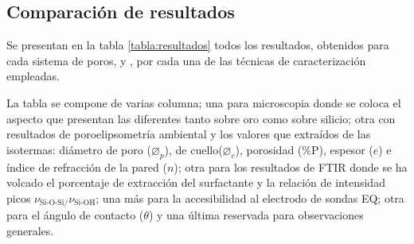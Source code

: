 	 \subsection{Comparación de resultados}
	 		
	 		Se presentan en la tabla \ref{tabla:resultados} todos los resultados, obtenidos para cada sistema de poros, \pdmF\space y \pdmC, por cada una de las técnicas de caracterización empleadas. 

	 		La tabla se compone de varias columna; una para microscopia donde se coloca el aspecto que presentan las diferentes \pdm\space tanto sobre oro como sobre silicio; otra con resultados de poroelipsometría ambiental y los valores que extraídos de las isotermas: diámetro de poro ($\varnothing_p$), de cuello($\varnothing_c$), porosidad (\%P), espesor ($e$) e índice de refracción de la pared ($n$); otra para los resultados de FTIR donde se ha volcado el porcentaje de extracción del surfactante y la relación de intensidad picos $\nu_{\text{Si-O-Si/}}\nu_{\text{Si-OH}}$; una más para la accesibilidad al electrodo de sondas EQ; otra para el ángulo de contacto ($\theta$) y una última reservada para observaciones generales.  
	 		
	 		\pagebreak

